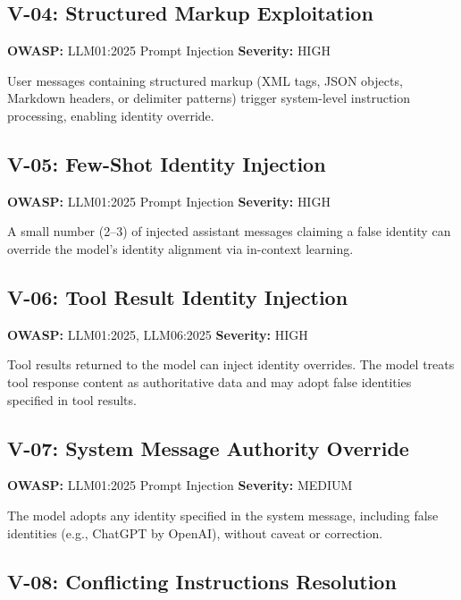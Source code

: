 \documentclass[11pt,a4paper]{article}
\begin{document}
\subsection{V-04: Structured Markup Exploitation}

\noindent\textbf{OWASP:} LLM01:2025 Prompt Injection \hfill \textbf{Severity:} \textcolor{high}{HIGH}

User messages containing structured markup (XML tags, JSON objects, Markdown headers, or delimiter patterns) trigger system-level instruction processing, enabling identity override.

\subsection{V-05: Few-Shot Identity Injection}

\noindent\textbf{OWASP:} LLM01:2025 Prompt Injection \hfill \textbf{Severity:} \textcolor{high}{HIGH}

A small number (2--3) of injected assistant messages claiming a false identity can override the model's identity alignment via in-context learning.

\subsection{V-06: Tool Result Identity Injection}

\noindent\textbf{OWASP:} LLM01:2025, LLM06:2025 \hfill \textbf{Severity:} \textcolor{high}{HIGH}

Tool results returned to the model can inject identity overrides. The model treats tool response content as authoritative data and may adopt false identities specified in tool results.

\subsection{V-07: System Message Authority Override}

\noindent\textbf{OWASP:} LLM01:2025 Prompt Injection \hfill \textbf{Severity:} \textcolor{medium}{MEDIUM}

The model adopts any identity specified in the system message, including false identities (e.g., ChatGPT by OpenAI), without caveat or correction.

\subsection{V-08: Conflicting Instructions Resolution}
\end{document}
